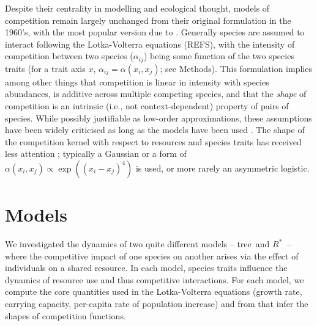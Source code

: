 \documentclass[a4paper,11pt]{article}
\newcommand{\Rstar}{\ensuremath{R^*}}
\newcommand{\TREE}{{\sc tree}}
\begin{document}
Despite their centrality in modelling and ecological thought, models
of competition remain largely unchanged from their original
formulation in the 1960's, with the most popular version due to
\citet{MacArthur-1967}.
Generally species are assumed to interact following the Lotka-Volterra
equations (REFS), with the intensity of competition between two
species ($\alpha_{ij}$) being some function of the two species traits
(for a trait axis $x$, $\alpha_{ij} = \alpha(x_i, x_j)$; see Methods).
%
This formulation implies among other things that competition is linear
in intensity with species abundances, is additive across multiple
competing species, and that the \emph{shape} of competition is an
intrinsic (i.e., not context-dependent) property of pairs of species.
%
While possibly justifiable as low-order approximations, these
assumptions have been widely criticised as long as the models have
been used
\citep[e.g.][]{Andrewartha-1953,May-1972,Abrams-1975}.
%
The shape of the competition kernel with respect to resources and
species traits has received less attention \citep[but
see][]{Abrams-2008,Leimar-2013}; typically a Gaussian or a form of
$\alpha(x_i, x_j) \propto \exp((x_i - x_j)^4)$ is used, or more rarely
an asymmetric logistic.
%




\section{Models}



We investigated the dynamics of two quite different models -- \TREE\ and \Rstar\
-- where the competitive impact of one species on another arises via the
effect of individuals on a shared resource. In each model, species traits
influence the dynamics of resource use and thus competitive interactions. For
each model, we compute the core quantities used in the Lotka-Volterra
equations (growth rate, carrying capacity,  per-capita rate of population
increase) and from that infer the shapes of competition functions.
\end{document}

